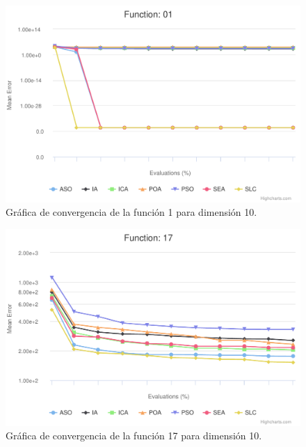 \begin{figure}
	\centering
	\includegraphics[scale=0.6]{imagenes/grafica-convergencia-10-1.pdf}
	\caption{Gráfica de convergencia de la función 1 para dimensión 10.}
	\label{grafica-convergencia-10-1}
\end{figure}

\begin{figure}
	\centering
	\includegraphics[scale=0.6]{imagenes/grafica-convergencia-10-17.pdf}
	\caption{Gráfica de convergencia de la función 17 para dimensión 10.}
	\label{grafica-convergencia-10-17}
\end{figure}

